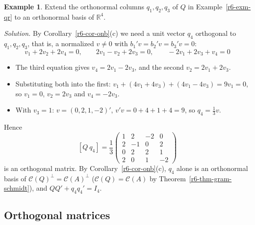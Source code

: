 \documentclass[12pt]{article}
\newcommand{\R}{\mathbb R}
\theoremstyle{definition}
\newtheorem{example}[theorem]{Example}
\begin{document}
\begin{example}\label{r6-exm-extend}
Extend the orthonormal columns \(q_1,q_2,q_3\) of \(Q\) in Example~\ref{r6-exm-qr} to an orthonormal basis of
\(\R^4\).

\textit{Solution.} By Corollary~\ref{r6-cor-onb}(c) we need a unit vector \(q_4\) orthogonal to \(q_1,q_2,q_3\),
that is, a normalized \(v\ne0\) with \(b_1'v=b_2'v=b_3'v=0\):
\[
v_1+2v_2+2v_4=0,\qquad 2v_1-v_2+2v_3=0,\qquad -2v_1+2v_3+v_4=0
\]
\begin{itemize}
\item The third equation gives \(v_4=2v_1-2v_3\), and the second \(v_2=2v_1+2v_3\).
\item Substituting both into the first: \(v_1+(4v_1+4v_3)+(4v_1-4v_3)=9v_1=0\), so \(v_1=0\), \(v_2=2v_3\) and
\(v_4=-2v_3\).
\item With \(v_3=1\): \(v=(0,2,1,-2)'\), \(v'v=0+4+1+4=9\), so \(q_4=\frac13v\).
\end{itemize}
Hence
\[
[Q\ q_4]=\frac13\begin{pmatrix}1&2&-2&0\\2&-1&0&2\\0&2&2&1\\2&0&1&-2\end{pmatrix}
\]
is an orthogonal matrix. By Corollary~\ref{r6-cor-onb}(c), \(q_4\) alone is an orthonormal basis of
\(\mathcal C(Q)^\perp=\mathcal C(A)^\perp\) (\(\mathcal C(Q)=\mathcal C(A)\) by Theorem~\ref{r6-thm-gram-schmidt}),
and \(QQ'+q_4q_4'=I_4\).
\end{example}

\subsection*{Orthogonal matrices}
\end{document}
